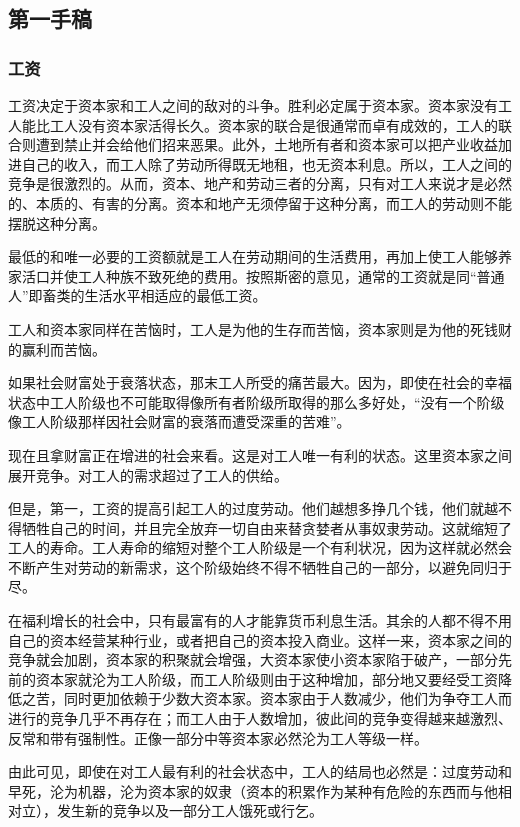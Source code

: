 \documentclass[a4paper]{article}
\begin{document}
    \begin{sloppy}
        \part{第一手稿}
        \section{
            工资
        }
        \setlength{\parindent}{2em}
        工资决定于资本家和工人之间的敌对的斗争。胜利必定属于资本家。资本家没有工人能比工人没有资本家活得长久。资本家的联合是很通常而卓有成效的，工人的联合则遭到禁止并会给他们招来恶果。此外，土地所有者和资本家可以把产业收益加进自己的收入，而工人除了劳动所得既无地租，也无资本利息。所以，工人之间的竞争是很激烈的。从而，资本、地产和劳动三者的分离，只有对工人来说才是必然的、本质的、有害的分离。资本和地产无须停留于这种分离，而工人的劳动则不能摆脱这种分离。
        
        最低的和唯一必要的工资额就是工人在劳动期间的生活费用，再加上使工人能够养家活口并使工人种族不致死绝的费用。按照斯密的意见，通常的工资就是同``普通人''即畜类的生活水平相适应的最低工资。

        工人和资本家同样在苦恼时，工人是为他的生存而苦恼，资本家则是为他的死钱财的赢利而苦恼。

        如果社会财富处于衰落状态，那末工人所受的痛苦最大。因为，即使在社会的幸福状态中工人阶级也不可能取得像所有者阶级所取得的那么多好处，“没有一个阶级像工人阶级那样因社会财富的衰落而遭受深重的苦难”。

        现在且拿财富正在增进的社会来看。这是对工人唯一有利的状态。这里资本家之间展开竞争。对工人的需求超过了工人的供给。
        
        但是，第一，工资的提高引起工人的过度劳动。他们越想多挣几个钱，他们就越不得牺牲自己的时间，并且完全放弃一切自由来替贪婪者从事奴隶劳动。这就缩短了工人的寿命。工人寿命的缩短对整个工人阶级是一个有利状况，因为这样就必然会不断产生对劳动的新需求，这个阶级始终不得不牺牲自己的一部分，以避免同归于尽。

        在福利增长的社会中，只有最富有的人才能靠货币利息生活。其余的人都不得不用自己的资本经营某种行业，或者把自己的资本投入商业。这样一来，资本家之间的竞争就会加剧，资本家的积聚就会增强，大资本家使小资本家陷于破产，一部分先前的资本家就沦为工人阶级，而工人阶级则由于这种增加，部分地又要经受工资降低之苦，同时更加依赖于少数大资本家。资本家由于人数减少，他们为争夺工人而进行的竞争几乎不再存在；而工人由于人数增加，彼此间的竞争变得越来越激烈、反常和带有强制性。正像一部分中等资本家必然沦为工人等级一样。

        由此可见，即使在对工人最有利的社会状态中，工人的结局也必然是：过度劳动和早死，沦为机器，沦为资本家的奴隶（资本的积累作为某种有危险的东西而与他相对立），发生新的竞争以及一部分工人饿死或行乞。
    \end{sloppy}
\end{document}
